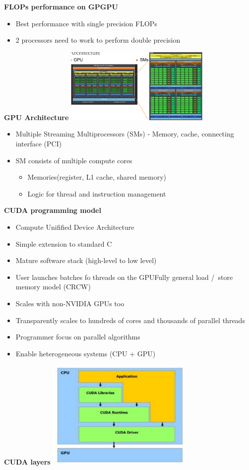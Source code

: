 \documentclass[10pt, landscape]{article}
\begin{document}
\begin{multicols}{4}
\textbf{FLOPs performance on GPGPU}
\begin{itemize}
    \item Best performance with single precision FLOPs
    \item 2 processors need to work to perform double precision
\end{itemize}

\textbf{GPU Architecture}
\includegraphics*[width=7cm]{gpu_archi}
\begin{itemize}
    \item Multiple Streaming Multiprocessors (SMs) - Memory, cache, connecting interface (PCI)
    \item SM consists of multiple compute cores 
    \begin{itemize}
        \item Memories(register, L1 cache, shared memory)
        \item Logic for thread and instruction management
    \end{itemize}
\end{itemize}


\textbf{CUDA programming model}
\begin{itemize}
    \item Compute Unifified Device Architecture
    \item Simple extension to standard C 
    \item Mature software stack (high-level to low level)
    \item User launches batches fo threads on the GPUFully general load /\ store memory model (CRCW)
    \item Scales with non-NVIDIA GPUs too
    \item Transparently scales to hundreds of cores and thousands of parallel threads 
    \item Programmer focus on parallel algorithms
    \item Enable heterogeneous systems (CPU + GPU)
\end{itemize}


\textbf{CUDA layers}
\includegraphics*[width=7cm]{cuda-layers}


\end{multicols}
\end{document}
